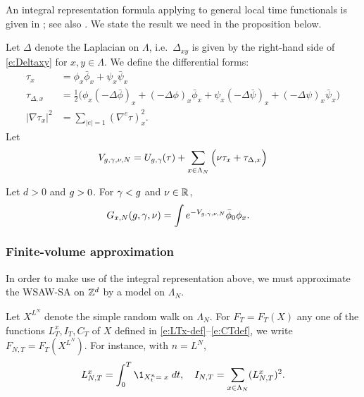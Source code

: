 An integral representation formula applying to general local time functionals
is given in \cite{BEI92,BIS09}; see also \cite[Appendix~A]{ST-phi4}.
We state the result we need in the proposition below.

Let $\Delta$ denote the Laplacian on $\Lambda$,
i.e.\ $\Delta_{xy}$ is given by the right-hand side of
\eqref{e:Deltaxy} for $x, y \in \Lambda$.
We define the differential forms:
\begin{align}
\label{e:taudef}
\tau_x
	&=
\phi_x \bar\phi_x + \psi_x \bar\psi_x
	\\
\label{e:addDelta}
\tau_{\Delta,x}
	&=
\frac 12
\Big(
	\phi_{x} (- \Delta \bar{\phi})_{x} + (- \Delta \phi)_{x} \bar{\phi}_{x}
		+
	\psi_{x}  (- \Delta \bar{\psi})_{x} + (- \Delta \psi)_{x}  \bar{\psi}_{x}
\Big)
	\\
\label{e:nablatau}
|\nabla \tau_x|^2
	&=
\sum_{|e|=1} (\nabla^e \tau)_x^2.
\end{align}
Let
\begin{equation}
\label{e:Vdef2}
V_{g,\gamma,\nu,N}
	=
U_{g,\gamma}(\tau)
	+
\sum_{x\in\Lambda_N}
\Big(
	\nu \tau_x + \tau_{\Delta,x}
\Big)
\end{equation}

\begin{prop}
Let $d > 0$ and $g > 0$. For $\gamma < g$ and $\nu \in {\mathbb R}$,
\begin{align}
\label{e:Grep-pos-bis}
G_{x,N}(g, \gamma, \nu)
	&=
\int e^{-V_{g,\gamma,\nu,N}} \bar\phi_0 \phi_x.
\end{align}
\end{prop}

\subsubsection{Finite-volume approximation}

In order to make use of the integral representation above, we must approximate the
WSAW-SA on ${ {{\mathbb Z}}^d }$ by a model on $\Lambda_N$.

Let $X^{L^N}$ denote the simple random walk on $\Lambda_N$.
For $F_T = F_T(X)$ any one of the functions $L_T^x,I_T,C_T$
of $X$ defined in \eqref{e:LTx-def}--\eqref{e:CTdef},
we write $F_{N,T} = F_T(X^{L^N})$. For instance, with $n=L^N$,
\begin{equation}
    L^x_{N,T} = \int_0^T \1_{X^{n}_t=\;x} \; dt,
    \quad I_{N,T} = \sum_{x \in \Lambda_N}(L_{N,T}^x)^2 .
\end{equation}

